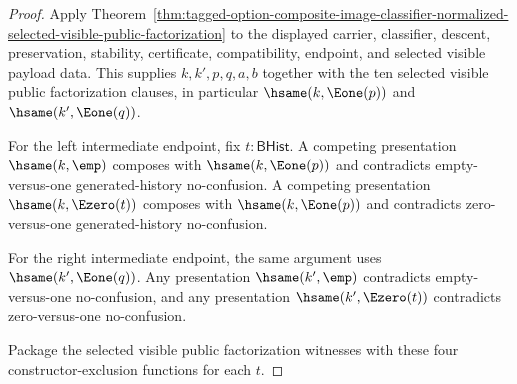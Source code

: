 \begin{proof}
Apply Theorem~\ref{thm:tagged-option-composite-image-classifier-normalized-selected-visible-public-factorization} to the displayed carrier, classifier, descent, preservation, stability, certificate, compatibility, endpoint, and selected visible payload data. This supplies $k,k',p,q,a,b$ together with the ten selected visible public factorization clauses, in particular $\hsame(k,\Eone(p))$ and $\hsame(k',\Eone(q))$.

For the left intermediate endpoint, fix $t:\mathsf{BHist}$. A competing presentation $\hsame(k,\emp)$ composes with $\hsame(k,\Eone(p))$ and contradicts empty-versus-one generated-history no-confusion. A competing presentation $\hsame(k,\Ezero(t))$ composes with $\hsame(k,\Eone(p))$ and contradicts zero-versus-one generated-history no-confusion.

For the right intermediate endpoint, the same argument uses $\hsame(k',\Eone(q))$. Any presentation $\hsame(k',\emp)$ contradicts empty-versus-one no-confusion, and any presentation $\hsame(k',\Ezero(t))$ contradicts zero-versus-one no-confusion.

Package the selected visible public factorization witnesses with these four constructor-exclusion functions for each $t$.
\end{proof}
